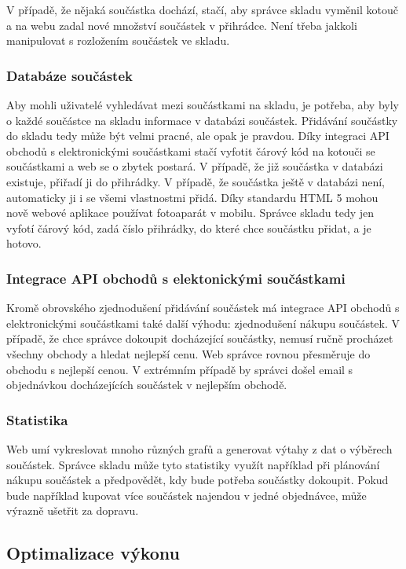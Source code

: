 \documentclass[12pt, a4paper, oneside]{article}
\begin{document}
V případě, že nějaká součástka dochází, stačí, aby správce skladu vyměnil kotouč a na webu zadal nové množství součástek v přihrádce. Není třeba jakkoli manipulovat s rozložením součástek ve skladu.


\subsubsection{Databáze součástek}

Aby mohli uživatelé vyhledávat mezi součástkami na skladu, je potřeba, aby byly o každé součástce na skladu informace v databázi součástek. Přidávání součástky do skladu tedy může být velmi pracné, ale opak je pravdou. Díky integraci API obchodů s elektronickými součástkami stačí vyfotit čárový kód na kotouči se součástkami a web se o zbytek postará. V případě, že již součástka v databázi existuje, přiřadí ji do přihrádky. V případě, že součástka ještě v databázi není, automaticky ji i se všemi vlastnostmi přidá. Díky standardu HTML 5 mohou nově webové aplikace používat fotoaparát v mobilu. Správce skladu tedy jen vyfotí čárový kód, zadá číslo přihrádky, do které chce součástku přidat, a je hotovo.

\subsubsection{Integrace API obchodů s elektonickými součástkami}

Kromě obrovského zjednodušení přidávání součástek má integrace API obchodů s elektronickými součástkami také další výhodu: zjednodušení nákupu součástek. V případě, že chce správce dokoupit docházející součástky, nemusí ručně procházet všechny obchody a hledat nejlepší cenu. Web správce rovnou přesměruje do obchodu s nejlepší cenou. V extrémním případě by správci došel email s objednávkou docházejících součástek v nejlepším obchodě.

\subsubsection{Statistika}

Web umí vykreslovat mnoho různých grafů a generovat výtahy z dat o výběrech součástek. Správce skladu může tyto statistiky využít například při plánování nákupu součástek a předpovědět, kdy bude potřeba součástky dokoupit. Pokud bude například kupovat více součástek najendou v jedné objednávce, může výrazně ušetřit za dopravu.

\subsection{Optimalizace výkonu}
\end{document}
